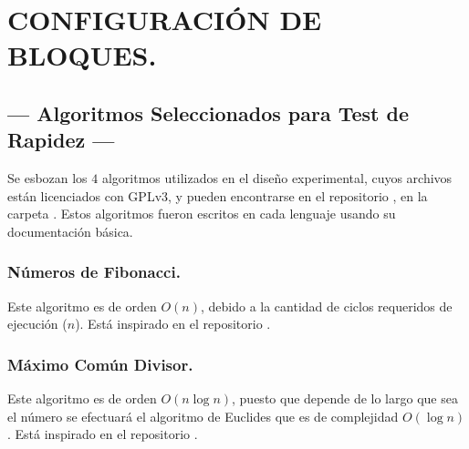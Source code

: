 \documentclass[11pt,a4paper]{article}
\begin{document}
\section{CONFIGURACIÓN DE BLOQUES.} %
\label{sec:conf_bloques}

\subsection{--- Algoritmos Seleccionados para Test de Rapidez ---} %
\label{sub:algoritmos}
Se esbozan los \(4\) algoritmos utilizados en el diseño experimental, cuyos archivos están licenciados con GPLv3, y pueden encontrarse en el repositorio , en la carpeta .
Estos algoritmos fueron escritos en cada lenguaje usando su documentación básica. 
 
\subsubsection{Números de Fibonacci.} %
\label{subs:fibo}
Este algoritmo es de orden \(O(n)\), debido a la cantidad de ciclos requeridos de ejecución (\(n\)).
Está inspirado en el repositorio .

\subsubsection{Máximo Común Divisor.} %
\label{subs:mcd}
Este algoritmo es de orden \(O(n \log n)\), puesto que depende de lo largo que sea el número se efectuará el algoritmo de Euclides  que es de complejidad \(O(\log n)\).
Está inspirado en el repositorio .
\end{document}
